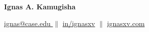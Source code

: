 \begin{center}
    \vspace{-1mm}
    \begin{center}
        \LARGE \bfseries Ignas A. Kamugisha
    \end{center}

    \begin{center}
        \vspace{-2mm}
        \faEnvelope \space \href{mailto:ignas@case.edu}{ignas@case.edu } $\parallel$ 
        \faLinkedin \space \href{https://linkedin.com/in/ignasxv}{in/ignasxv} $\parallel$
        \faGlobe \space \href{https://ignasxv.com}{ignasxv.com} \space  
    \end{center}
    
\end{center} 